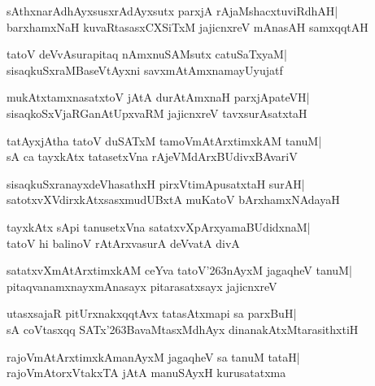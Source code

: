 \documentclass[twoside,12pt,openright]{book}
\def\S{\char'263}
\newcounter{shloka}[chapter]
\begin{document}
\begin{shloka}%
sAthxnarAdhAyxsusxrAdAyxsutx parxjA rAjaMshacxtuviRdhAH|\\
barxhamxNaH kuvaRtasasxCXSiTxM jajicnxreV mAnasAH samxqqtAH
\end{shloka}

\begin{shloka}%
tatoV deVvAsurapitaq nAmxnuSAMsutx catuSaTxyaM|\\
sisaqkuSxraMBaseVtAyxni savxmAtAmxnamayUyujatf
\end{shloka}

\begin{shloka}%
mukAtxtamxnasatxtoV jAtA durAtAmxnaH parxjApateVH|\\
sisaqkoSxVjaRGanAtUpxvaRM jajicnxreV tavxsurAsatxtaH
\end{shloka}

\begin{shloka}%
tatAyxjAtha tatoV duSATxM tamoVmAtArxtimxkAM tanuM|\\
sA ca tayxkAtx tatasetxVna rAjeVMdArxBUdivxBAvariV
\end{shloka}

\begin{shloka}%
sisaqkuSxranayxdeVhasathxH pirxVtimApusatxtaH surAH|\\
satotxvXVdirxkAtxsasxmudUBxtA muKatoV bArxhamxNAdayaH
\end{shloka}

\begin{shloka}%
tayxkAtx sApi tanusetxVna satatxvXpArxyamaBUdidxnaM|\\
tatoV hi balinoV rAtArxvasurA deVvatA divA
\end{shloka}

\begin{shloka}%
satatxvXmAtArxtimxkAM ceYva tatoV\S nAyxM jagaqheV tanuM|\\
pitaqvanamxnayxmAnasayx pitarasatxsayx jajicnxreV
\end{shloka}

\begin{shloka}%
utasxsajaR pitUrxnakxqqtAvx tatasAtxmapi sa parxBuH|\\
sA coVtasxqq SATx\S BavaMtasxMdhAyx dinanakAtxMtarasithxtiH
\end{shloka}

\begin{shloka}%
rajoVmAtArxtimxkAmanAyxM jagaqheV sa tanuM tataH|\\
rajoVmAtorxVtakxTA jAtA manuSAyxH kurusatatxma
\end{shloka}
\end{document}
